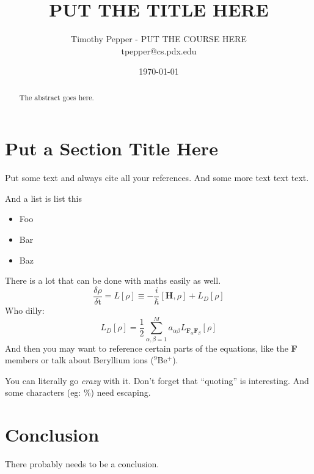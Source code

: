 \documentclass[12pt, twocolumn]{article}
\begin{document}
\title{PUT THE TITLE HERE}
\author{%
Timothy Pepper - PUT THE COURSE HERE\\
{\ttfamily\normalsize tpepper@cs.pdx.edu}\\
} %
\date{\today}


\maketitle

\begin{abstract}

The abstract goes here.

\end{abstract}

\section{Put a Section Title Here}

Put some text and always cite all your references\cite{vanmeter2006aiq}.
And some more text text text.

And a list is list this
\begin{itemize}
\item Foo
\item Bar
\item Baz
\end{itemize}

There is a lot that can be done with maths easily as well.
\[
\frac{\delta\rho}{\delta\textrm{t}} = L[\rho] \equiv -
\frac{i}{\hbar}[\textbf{H},\rho] + L_{D}[\rho]
\]
Who dilly:
\[
L_{D}[\rho] = \frac{1}{2} \sum_{\alpha,\beta=1}^{M} a_{\alpha\beta}
L_{\textbf{F}_{\alpha}\textbf{F}_{\beta}} [\rho]
\]
And then you may want to reference certain parts of the equations, like the
{\bf F} members or talk about Beryllium ions ($^{\textrm{9}}$Be$^{\textrm{+}}$).

You can literally go {\it crazy} with it.  Don't forget that ``quoting'' is
interesting.  And some characters (eg: \%) need escaping.

\section{Conclusion}

There probably needs to be a conclusion.

{}

\end{document}
